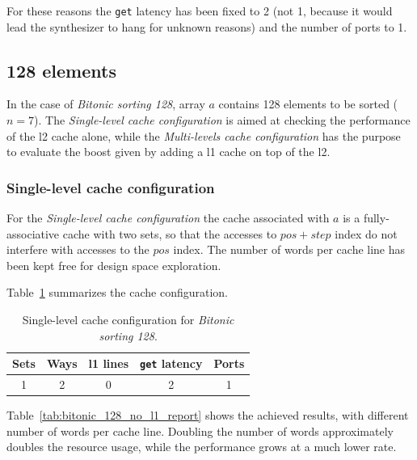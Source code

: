 \documentclass[11pt,a4paper,oneside]{memoir}
\begin{document}
For these reasons the \texttt{get} latency has been fixed to 2 (not 1, because
it would lead the synthesizer to hang for unknown reasons) and the number of
ports to 1.

\subsection{128 elements}
In the case of \emph{Bitonic sorting 128}, array $a$ contains 128 elements to be
sorted ($n = 7$).
The \emph{Single-level cache configuration} is aimed at checking the performance
of the \ac{l2} cache alone, while the \emph{Multi-levels cache configuration}
has the purpose to evaluate the boost given by adding a \ac{l1} cache on top of
the \ac{l2}.

\subsubsection{Single-level cache configuration}
For the \emph{Single-level cache configuration} the cache associated with $a$ is
a fully-associative cache with two sets, so that the accesses to $pos + step$
index do not interfere with accesses to the $pos$ index.
The number of words per cache line has been kept free for design space
exploration.

Table~\ref{tab:bitonic_128_no_l1_config} summarizes the cache configuration.

\begin{table}[H]
	\begin{center}
		\begin{tabular}{ccccc}
			\hline
			\rowcolor{gray!50}
			\textbf{Sets} & \textbf{Ways} & \textbf{\ac{l1} lines} &
			\textbf{\texttt{get} latency} & \textbf{Ports} \\
			\hline
			1 & 2 & 0 & 2 & 1 \\
			\hline
		\end{tabular}
	\end{center}
	\caption{Single-level cache configuration for \emph{Bitonic sorting 128}.}
	\label{tab:bitonic_128_no_l1_config}
\end{table}

Table~\ref{tab:bitonic_128_no_l1_report} shows the achieved results, with
different number of words per cache line.
Doubling the number of words approximately doubles the resource usage, while
the performance grows at a much lower rate.
\end{document}
